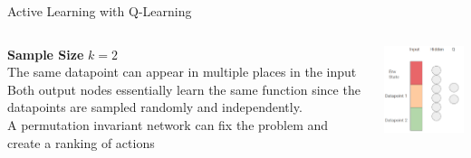 \documentclass[aspectratio=169, 11pt, invertlogo]{ismll-slides}
\begin{document}

\begin{frame}[fragile]{Active Learning with Q-Learning}
	\begin{columns}
		\begin{column}{.5\linewidth}
			\textbf{Sample Size} $k=2$ \\ [2mm]
			The same datapoint can appear in multiple places in the input \\[2mm]
			Both output nodes essentially learn the same function since the datapoints are sampled randomly and independently. \\ [2mm]
			A permutation invariant network can fix the problem and create a ranking of actions
		\end{column}
		\begin{column}{.4\linewidth}
			\includegraphics[width=160px]{pics/q}
		\end{column}
	\end{columns}
\end{frame}


\end{document}
